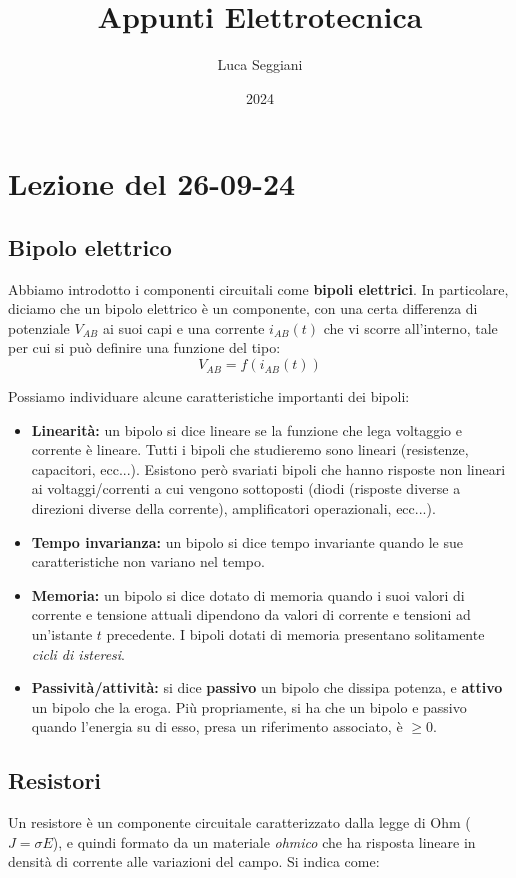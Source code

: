 \documentclass[a4paper,11pt]{article}
\title{Appunti Elettrotecnica}
\author{Luca Seggiani}
\date{2024}
\begin{document}
\section{Lezione del 26-09-24}

\thispagestyle{empty}
\pagestyle{fancy}

\subsection{Bipolo elettrico}
Abbiamo introdotto i componenti circuitali come \textbf{bipoli elettrici}.
In particolare, diciamo che un bipolo elettrico è un componente, con una certa differenza di potenziale $V_{AB}$ ai suoi capi e una corrente $i_{AB}(t)$ che vi scorre all'interno, tale per cui si può definire una funzione del tipo:
$$
V_{AB} = f(i_{AB}(t))
$$

Possiamo individuare alcune caratteristiche importanti dei bipoli:
\begin{itemize}
	\item \textbf{Linearità:} un bipolo si dice lineare se la funzione che lega voltaggio e corrente è lineare.
		Tutti i bipoli che studieremo sono lineari (resistenze, capacitori, ecc...).
		Esistono però svariati bipoli che hanno risposte non lineari ai voltaggi/correnti a cui vengono sottoposti (diodi (risposte diverse a direzioni diverse della corrente), amplificatori operazionali, ecc...).
	\item \textbf{Tempo invarianza:} un bipolo si dice tempo invariante quando le sue caratteristiche non variano nel tempo.
	\item \textbf{Memoria:} un bipolo si dice dotato di memoria quando i suoi valori di corrente e tensione attuali dipendono da valori di corrente e tensioni ad un'istante $t$ precedente.
		I bipoli dotati di memoria presentano solitamente \textit{cicli di isteresi}.
	\item \textbf{Passività/attività:} si dice \textbf{passivo} un bipolo che dissipa potenza, e \textbf{attivo} un bipolo che la eroga.
		Più propriamente, si ha che un bipolo e passivo quando l'energia su di esso, presa un riferimento associato, è $\geq 0$.
\end{itemize}

\subsection{Resistori}
Un resistore è un componente circuitale caratterizzato dalla legge di Ohm ($ J = \sigma E$), e quindi formato da un materiale \textit{ohmico} che ha risposta lineare in densità di corrente alle variazioni del campo.
Si indica come:
\end{document}
